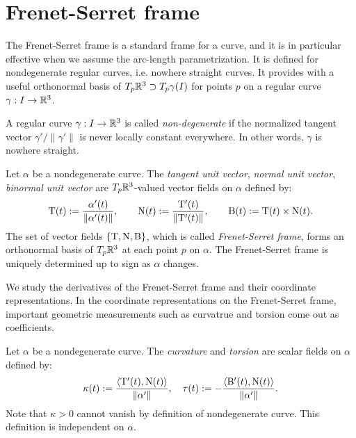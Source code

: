 \documentclass{../note}
\def\a{\alpha}
\begin{document}
\section{Frenet-Serret frame}

The Frenet-Serret frame is a standard frame for a curve, and it is in particular effective when we assume the arc-length parametrization.
It is defined for nondegenerate regular curves, i.e. nowhere straight curves.
It provides with a useful orthonormal basis of $T_p\mathbb{R}^3\supset T_p\gamma(I)$ for points $p$ on a regular curve $\gamma:I\to\mathbb{R}^3$.
\begin{prb}
A regular curve $\gamma:I\to\mathbb{R}^3$ is called \emph{non-degenerate} if the normalized tangent vector $\gamma'/\|\gamma'\|$ is never locally constant everywhere.
In other words, $\gamma$ is nowhere straight.
\end{prb}

\begin{defn}
Let $\a$ be a nondegenerate curve.
The \emph{tangent unit vector}, \emph{normal unit vector}, \emph{binormal unit vector} are $T_p\mathbb{R}^3$-valued vector fields on $\a$ defined by:
\[\rT(t):=\frac{\a'(t)}{\|\a'(t)\|},\qquad\rN(t):=\frac{\rT'(t)}{\|\rT'(t)\|},\qquad\rB(t):=\rT(t)\times\rN(t).\]
The set of vector fields $\{\mathrm{T},\mathrm{N},\mathrm{B}\}$, which is called \emph{Frenet-Serret frame}, forms an orthonormal basis of $T_p\mathbb{R}^3$ at each point $p$ on $\a$.
The Frenet-Serret frame is uniquely determined up to sign as $\a$ changes.
\end{defn}

We study the derivatives of the Frenet-Serret frame and their coordinate representations.
In the coordinate representations on the Frenet-Serret frame, important geometric measurements such as curvatrue and torsion come out as coefficients.

\begin{defn}
Let $\a$ be a nondegenerate curve.
The \emph{curvature} and \emph{torsion} are scalar fields on $\a$ defined by:
\[\kappa(t):=\frac{\<\rT'(t),\rN(t)\>}{\|\a'\|},\quad\tau(t):=-\frac{\<\rB'(t),\rN(t)\>}{\|\a'\|}.\]
Note that $\kappa>0$ cannot vanish by definition of nondegenerate curve.
This definition is independent on $\a$.
\end{defn}
\end{document}
